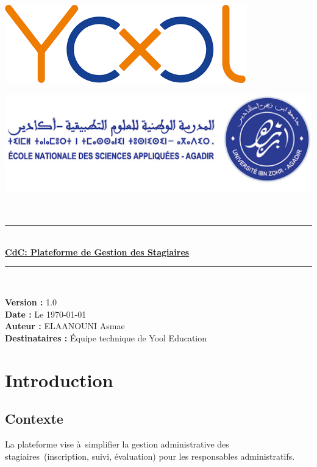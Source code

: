 \documentclass{report}
\begin{document}
\linespread{1}


\begin{minipage}{0.5\linewidth}
  \raggedright
\includegraphics[width=0.6\linewidth]{yool.png}
\end{minipage}
\hfill
\begin{minipage}{0.5\linewidth}
  \raggedleft
\includegraphics[width=0.65\linewidth]{logo.png}
\end{minipage}
\\


\vspace{6cm}

\newcommand{\HRule}{\rule{\linewidth}{0.55mm}}

\begin{center}
\HRule \\[0.25cm]
\huge\textbf{\underline{CdC: Plateforme de Gestion des Stagiaires}} \\[0.25cm]
\HRule \\
 [6cm]
 \end{center}
 \begin{center}
   \Large\textbf{Version :} 1.0\\
   \Large\textbf{Date :} Le \today\\
   \Large\textbf{Auteur :} ELAANOUNI Asmae\\
   \Large\textbf{Destinataires :} Équipe technique de Yool Education\\
 \end{center}

\clearpage
\section*{Introduction}
\subsection*{Contexte}
La plateforme vise à simplifier la gestion administrative des stagiaires (inscription, suivi, évaluation) pour les responsables administratifs.
\end{document}
